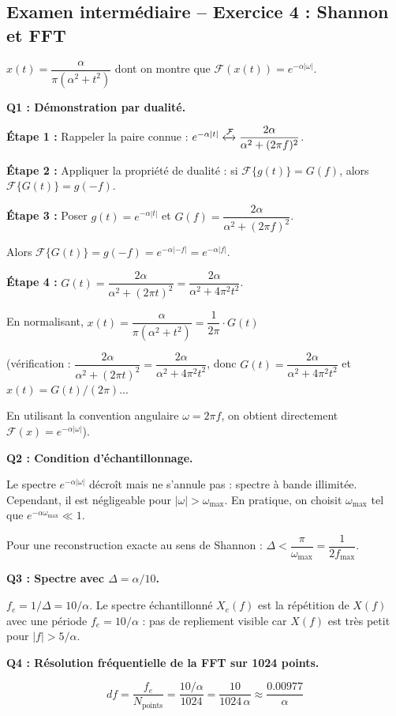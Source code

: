 \documentclass[12pt,a4paper]{article}
\newcommand{\TF}{\mathcal{F}}
\newcommand{\step}[1]{\textcolor{coursbleu}{\textbf{Étape #1 :}}}
\begin{document}
\subsection{Examen intermédiaire -- Exercice 4 : Shannon et FFT}

\begin{tcolorbox}[coursbox, title=Énoncé]
$x(t) = \dfrac{\alpha}{\pi(\alpha^2 + t^2)}$ \quad
dont on montre que $\TF(x(t)) = e^{-\alpha|\omega|}$.
\end{tcolorbox}

\begin{tcolorbox}[corrbox, title=Correction Exercice 4]
\textbf{Q1 : Démonstration par dualité.}

\step{1} Rappeler la paire connue : $e^{-\alpha|t|} \xleftrightarrow{\TF} \dfrac{2\alpha}{\alpha^2 + (2\pi f)^2}$.

\step{2} Appliquer la propriété de dualité : si $\TF\{g(t)\} = G(f)$, alors $\TF\{G(t)\} = g(-f)$.

\step{3} Poser $g(t) = e^{-\alpha|t|}$ et $G(f) = \dfrac{2\alpha}{\alpha^2+(2\pi f)^2}$.

Alors $\TF\{G(t)\} = g(-f) = e^{-\alpha|-f|} = e^{-\alpha|f|}$.

\step{4} $G(t) = \dfrac{2\alpha}{\alpha^2 + (2\pi t)^2} = \dfrac{2\alpha}{\alpha^2 + 4\pi^2 t^2}$.

En normalisant, $x(t) = \dfrac{\alpha}{\pi(\alpha^2+t^2)} = \dfrac{1}{2\pi}\cdot G(t)$

(vérification : $\dfrac{2\alpha}{\alpha^2+(2\pi t)^2} = \dfrac{2\alpha}{\alpha^2+4\pi^2 t^2}$,
donc $G(t) = \dfrac{2\alpha}{\alpha^2+4\pi^2 t^2}$
et $x(t) = G(t)/(2\pi)$... 

En utilisant la convention angulaire $\omega = 2\pi f$, on obtient directement $\TF(x) = e^{-\alpha|\omega|}$).

\bigskip
\textbf{Q2 : Condition d'échantillonnage.}

Le spectre $e^{-\alpha|\omega|}$ décroît mais ne s'annule pas : spectre à bande illimitée.
Cependant, il est négligeable pour $|\omega| > \omega_{\max}$.
En pratique, on choisit $\omega_{\max}$ tel que $e^{-\alpha\omega_{\max}} \ll 1$.

Pour une reconstruction exacte au sens de Shannon : $\Delta < \dfrac{\pi}{\omega_{\max}} = \dfrac{1}{2f_{\max}}$.

\bigskip
\textbf{Q3 : Spectre avec $\Delta = \alpha/10$.}

$f_e = 1/\Delta = 10/\alpha$. Le spectre échantillonné $X_e(f)$ est la répétition de $X(f)$
avec une période $f_e = 10/\alpha$ : pas de repliement visible car $X(f)$ est très petit
pour $|f| > 5/\alpha$.

\bigskip
\textbf{Q4 : Résolution fréquentielle de la FFT sur 1024 points.}

\[
  df = \frac{f_e}{N_{\text{points}}} = \frac{10/\alpha}{1024}
     = \frac{10}{1024\,\alpha} \approx \frac{0.00977}{\alpha}
\]
\end{tcolorbox}
\end{document}
